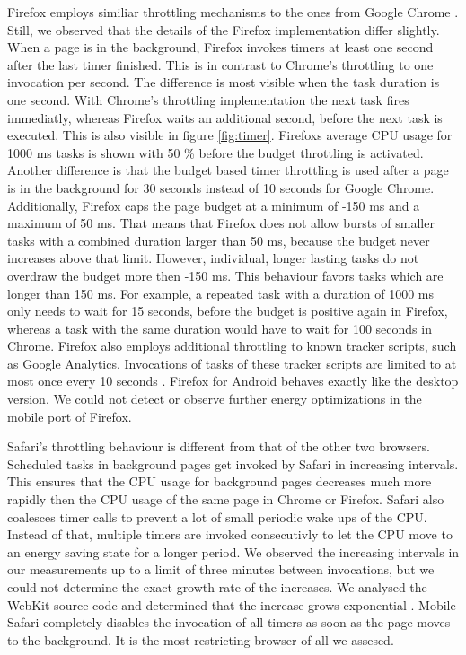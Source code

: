 \documentclass[
	ruledheaders=section,%
	class=report,%
	thesis={type=bachelor},%
	accentcolor=9c,%
	custommargins=true,%
	marginpar=false,%
	parskip=half-,%
	fontsize=11pt,%
]{tudapub}
\begin{document}
  Firefox employs similiar throttling mechanisms to the ones from Google Chrome \cite{mdn-page-visibility}. Still, we observed that the details of the Firefox implementation differ slightly. When a page is in the background, Firefox invokes timers at least one second after the last timer finished. This is in contrast to Chrome's throttling to one invocation per second. The difference is most visible when the task duration is one second. With Chrome's throttling implementation the next task fires immediatly, whereas Firefox waits an additional second, before the next task is executed. This is also visible in figure \ref{fig:timer}. Firefoxs average CPU usage for 1000 ms tasks is shown with 50 \% before the budget throttling is activated. Another difference is that the budget based timer throttling is used after a page is in the background for 30 seconds instead of 10 seconds for Google Chrome. Additionally, Firefox caps the page budget at a minimum of -150 ms and a maximum of 50 ms. That means that Firefox does not allow bursts of smaller tasks with a combined duration larger than 50 ms, because the budget never increases above that limit. However, individual, longer lasting tasks do not overdraw the budget more then -150 ms. This behaviour favors tasks which are longer than 150 ms. For example, a repeated task with a duration of 1000 ms only needs to wait for 15 seconds, before the budget is positive again in Firefox, whereas a task with the same duration would have to wait for 100 seconds in  Chrome. Firefox also employs additional throttling to known tracker scripts, such as Google Analytics. Invocations of tasks of these tracker scripts are limited to at most once every 10 seconds \cite{mdn-tracker-throttling}. Firefox for Android behaves exactly like the desktop version. We could not detect or observe further energy optimizations in the mobile port of Firefox. 

  Safari's throttling behaviour is different from that of the other two browsers. Scheduled tasks in background pages get invoked by Safari in increasing intervals. This ensures that the CPU usage for background pages decreases much more rapidly then the CPU usage of the same page in Chrome or Firefox. Safari also coalesces timer calls to prevent a lot of small periodic wake ups of the CPU. Instead of that, multiple timers are invoked consecutivly to let the CPU move to an energy saving state for a longer period. We observed the increasing intervals in our measurements up to a limit of three minutes between invocations, but we could not determine the exact growth rate of the increases. We analysed the WebKit source code and determined that the increase grows exponential \cite{webkit-timer-increases}. Mobile Safari completely disables the invocation of all timers as soon as the page moves to the background. It is the most restricting browser of all we assesed.
  
\end{document}
